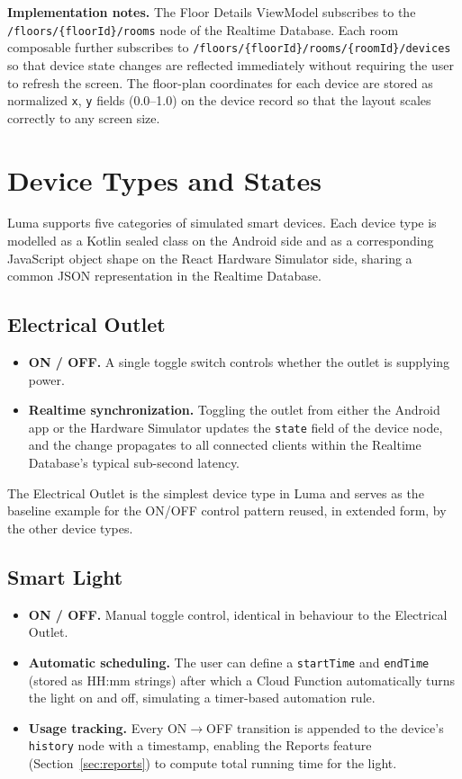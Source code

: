 \documentclass[11pt,a4paper]{article}
\begin{document}
\textbf{Implementation notes.} The Floor Details ViewModel subscribes to the \texttt{/floors/\{floorId\}/rooms} node of the Realtime Database. Each room composable further subscribes to \texttt{/floors/\{floorId\}/rooms/\{roomId\}/devices} so that device state changes are reflected immediately without requiring the user to refresh the screen. The floor-plan coordinates for each device are stored as normalized \texttt{x}, \texttt{y} fields (0.0--1.0) on the device record so that the layout scales correctly to any screen size.

\section{Device Types and States}
\label{sec:devices}

Luma supports five categories of simulated smart devices. Each device type is modelled as a Kotlin sealed class on the Android side and as a corresponding JavaScript object shape on the React Hardware Simulator side, sharing a common JSON representation in the Realtime Database.

\subsection{Electrical Outlet}
\begin{itemize}
    \item \textbf{ON / OFF.} A single toggle switch controls whether the outlet is supplying power.
    \item \textbf{Realtime synchronization.} Toggling the outlet from either the Android app or the Hardware Simulator updates the \texttt{state} field of the device node, and the change propagates to all connected clients within the Realtime Database's typical sub-second latency.
\end{itemize}
The Electrical Outlet is the simplest device type in Luma and serves as the baseline example for the ON/OFF control pattern reused, in extended form, by the other device types.

\subsection{Smart Light}
\begin{itemize}
    \item \textbf{ON / OFF.} Manual toggle control, identical in behaviour to the Electrical Outlet.
    \item \textbf{Automatic scheduling.} The user can define a \texttt{startTime} and \texttt{endTime} (stored as HH:mm strings) after which a Cloud Function automatically turns the light on and off, simulating a timer-based automation rule.
    \item \textbf{Usage tracking.} Every ON$\to$OFF transition is appended to the device's \texttt{history} node with a timestamp, enabling the Reports feature (Section~\ref{sec:reports}) to compute total running time for the light.
\end{itemize}
\end{document}
